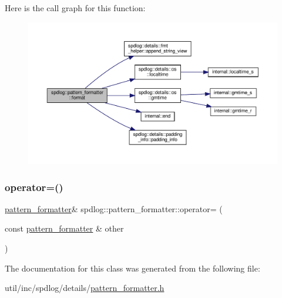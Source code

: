Here is the call graph for this function\+:
\nopagebreak
\begin{figure}[H]
\begin{center}
\leavevmode
\includegraphics[width=350pt]{classspdlog_1_1pattern__formatter_ae43e84d7421ee7810b22ce1dc817ca3f_cgraph}
\end{center}
\end{figure}
\mbox{\label{classspdlog_1_1pattern__formatter_a868ba15a181c7a407780aaa84902de31}} 
\subsubsection{\texorpdfstring{operator=()}{operator=()}}
{\footnotesize\ttfamily \hyperlink{classspdlog_1_1pattern__formatter}{pattern\+\_\+formatter}\& spdlog\+::pattern\+\_\+formatter\+::operator= (\begin{DoxyParamCaption}\item[{const \hyperlink{classspdlog_1_1pattern__formatter}{pattern\+\_\+formatter} \&}]{other }\end{DoxyParamCaption})\hspace{0.3cm}{\ttfamily [delete]}}



The documentation for this class was generated from the following file\+:\begin{DoxyCompactItemize}
\item 
util/inc/spdlog/details/\hyperlink{pattern__formatter_8h}{pattern\+\_\+formatter.\+h}\end{DoxyCompactItemize}
